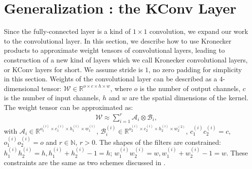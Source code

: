 \documentclass{article}
\def\RB{{\mathbb R}}
\begin{document}
\section{Generalization : the KConv Layer}
Since the fully-connected layer is a kind of $1\times 1$ convolution, we expand our work to the convolutional layer. In this section, we describe how to use Kronecker products to approximate weight tensors of convolutional layers, leading to construction of a new kind of layers which we call Kronecker convolutional layers, or KConv layers for short. We assume stride is $1$, no zero padding for simplicity in this section.
Weights of the convolutional layer can be described as a $4$-dimensional tensor: $\mathcal{W} \in \RB^{o\times c\times h \times w}$,
where $o$ is the number of output channels, $c$ is the number of input channels, $h$ and $w$ are the spatial dimensions of the kernel. The weight
tensor can be approximated as:
\begin{align}
\mathcal{W} \approx \sum_{i=1}^{r}\mathcal{A}_i\otimes\mathcal{B}_i,
\end{align}
with $\mathcal{A}_i \in \RB^{o_1^{(i)}\times c_1^{(i)}\times h_1^{(i)}\times w_1^{(i)}}$, $\mathcal{B}_i^{(i)} \in \RB^{o_2^{(i)}\times c_2^{(i)}\times h_2^{(i)}\times w_2^{(2)}}$, $c_1^{(i)}c_2^{(i)}=c$, $o_1^{(i)}o_2^{(i)}=o$ and $r \in \mathbb{N}$, $r > 0$. The shapes of the filters are constrained: $h_1^{(i)}h_2^{(i)}=h, h_1^{(i)}+h_2^{(i)}-1=h$;  $w_1^{(i)}w_2^{(i)}=w, w_1^{(i)}+w_2^{(i)}-1=w$. These constraints are the same as two schemes discussed in \cite{DBLP:conf/bmvc/JaderbergVZ14}.
\end{document}
